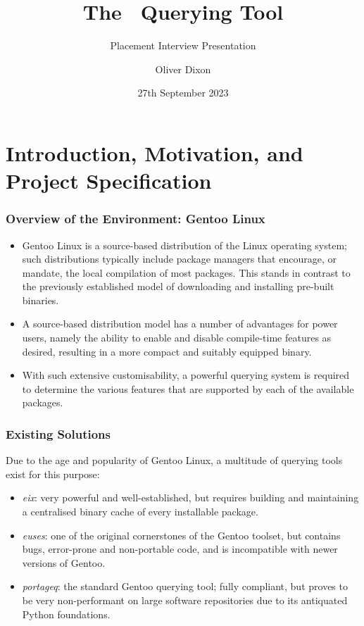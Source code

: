 \documentclass{beamer}
\date{27th September 2023} %
\title[Placement Interview Presentation]{The \programname\ Querying Tool}
\author[Oliver Dixon]{
    \texorpdfstring{Oliver Dixon \raisebox{.5pt}{%
        \texttt{\footnotesize\href{mailto:Oliver Dixon <od641@york.ac.uk>}
            {<od641@york.ac.uk>}}
    }}{Oliver Dixon}}
\institute[University of York]{Department of Computer Science, University of
    York \and Department of Mathematics, University of York}
\subtitle{Placement Interview Presentation}
\numberwithin{figure}{section}
\begin{document}
\frame{\titlepage}
\section{Introduction, Motivation, and Project Specification}
\begin{frame}
    \frametitle{Overview of the Environment: Gentoo Linux}
    \begin{itemize}
        \item Gentoo Linux is a source-based distribution of the Linux operating
            system; such distributions typically include package managers that
            encourage, or mandate, the local compilation of most packages. This
            stands in contrast to the previously established model of
            downloading and installing pre-built binaries.
        \item A source-based distribution model has a number of advantages for
            power users, namely the ability to enable and disable compile-time
            features as desired, resulting in a more compact and suitably
            equipped binary.
        \item With such extensive customisability, a powerful querying system is
            required to determine the various features that are supported by
            each of the available packages.
    \end{itemize}
\end{frame}
\begin{frame}
    \frametitle{Existing Solutions}
    Due to the age and popularity of Gentoo Linux, a multitude of querying tools
    exist for this purpose:
    \pause

    \begin{itemize}
        \item \emph{eix}: very powerful and well-established, but requires
            building and maintaining a centralised binary cache of every
            installable package.
        \item \emph{euses}: one of the original cornerstones of the Gentoo
            toolset, but contains bugs, error-prone and non-portable code, and
            is incompatible with newer versions of Gentoo.
        \item \emph{portageq}: the standard Gentoo querying tool; fully
            compliant, but proves to be very non-performant on large software
            repositories due to its antiquated Python foundations.
    \end{itemize}
\end{frame}
\end{document}
